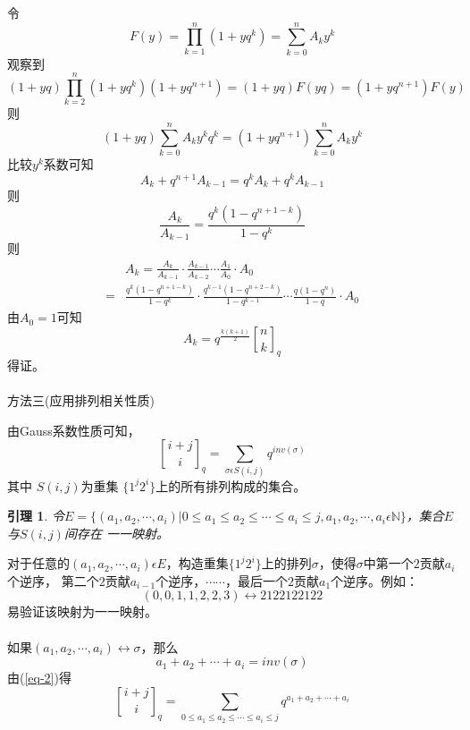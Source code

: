 \documentclass[a4paper,12pt]{ctexart}
\newtheorem{lem}{引理}[section]
\def\pf{\noindent {\bf 证明\ }}
\begin{document}
令
\begin{equation*}
	F(y)=\prod_{k=1}^n (1+yq^k)=\sum_{k=0}^n A_k  y^k
\end{equation*}
观察到
\begin{equation*}
	(1+yq)\prod_{k=2}^n (1+yq^k)(1+yq^{n+1})=(1+yq)F(yq)=(1+yq^{n+1})F(y)
\end{equation*}
则
\begin{equation*}
	(1+yq)\sum_{k=0}^n A_k  y^k q^k=(1+yq^{n+1})\sum_{k=0}^n A_k  y^k
\end{equation*}
比较$y^k$系数可知
\begin{equation*}
	A_k +q^{n+1}A_{k-1}=q^k A_k+q^k A_{k-1}
\end{equation*}
则
\begin{equation*}
	\frac{A_k}{A_{k-1}} =\frac{q^k(1-q^{n+1-k})}{1-q^k}
\end{equation*}
则
\begin{align*}
	&A_k =\frac{A_k}{A_{k-1}}\cdot\frac{A_{k-1}}{A_{k-2}}\cdots\frac{A_{1}}{A_{0}}\cdot A_{0}\\
	=&\frac{q^k(1-q^{n+1-k})}{1-q^k}\cdot\frac{q^{k-1}(1-q^{n+2-k})}{1-q^{k-1}}\cdots \frac{q(1-q^{n})}{1-q}\cdot A_{0}
\end{align*}
由$A_0=1$可知
\begin{equation*}
	A_k =q^{\frac{k(k+1)}{2}}{n \brack k}_q
\end{equation*}
得证。\\
~\\
方法三(应用排列相关性质)

由Gauss系数性质可知，
\begin{equation}
	\label{eq-2}
	{{i+j} \brack i}_q=\sum_{\sigma \epsilon S(i,j)} q^{inv(\sigma)}
\end{equation}
其中 $S(i,j)$为重集 $\{1^j 2^i\}$上的所有排列构成的集合。

\begin{lem}
	令$E=\{(a_1,a_2,\cdots,a_i)|0 \leq a_1 \leq a_2 \leq\cdots \leq a_i\leq j, a_1,a_2,\cdots,a_i \epsilon \mathbb{N} \}$，集合$E$与$S(i,j)$间存在
	一一映射。
\end{lem}

\pf
对于任意的$(a_1,a_2,\cdots,a_i)\epsilon E$，构造重集$\{1^j 2^i\}$上的排列$\sigma$，使得$\sigma$中第一个$2$贡献$a_i$个逆序，
第二个$2$贡献$a_{i-1}$个逆序，$\cdots\cdots$，最后一个$2$贡献$a_1$个逆序。例如：
\begin{equation*}
	(0,0,1,1,2,2,3)\longleftrightarrow 2122122122
\end{equation*}
易验证该映射为一一映射。
~\\
~\\
如果$(a_1,a_2,\cdots,a_i)\longleftrightarrow \sigma$，那么
\begin{equation*}
	a_1+a_2+\cdots+a_i=inv(\sigma)
\end{equation*}
由(\ref{eq-2})得
\begin{equation}
	\label{eq-3}
	{{i+j} \brack i}_q=\sum_{0 \leq a_1 \leq a_2 \leq\cdots \leq a_i\leq j} q^{a_1+a_2+\cdots+a_i}
\end{equation}
\end{document}
